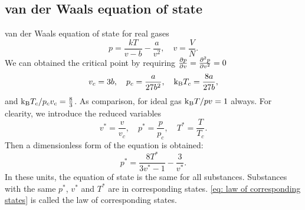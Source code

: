 \documentclass[10pt]{article}
\begin{document}
\subsection{van der Waals equation of state}

van der Waals equation of state for real gases
\begin{equation}
	p = \frac{k T}{v - b} - \frac{a}{v^2}, \quad v = \frac{V}{N}.
\end{equation}
We can obtained the critical point by requiring $\pdv{p}{v} = \pdv[2]{p}{v} = 0$
\begin{equation}
	v_c = 3b, \quad p_c = \frac{a}{27b^2}, \quad {\mathrm{k_B}} T_c = \frac{8a}{27b},
\end{equation}
and ${\mathrm{k_B}} T_c / p_c v_c = \frac{8}{3}$. As comparison, for ideal gas ${\mathrm{k_B}} T / p v = 1$ always. For clearity, we  introduce the reduced variables
\begin{equation}
	v^* = \frac{v}{v_c}, \quad p^* = \frac{p}{p_c}, \quad T^* = \frac{T}{T_c}.
\end{equation}
Then a dimensionless form of the equation is obtained:
\begin{equation}
	p^* = \frac{8T^*}{3v^* - 1} - \frac{3}{v^*}. \label{eq: law of corresponding states}
\end{equation}
In these units, the equation of state is the same for all substances. Substances with the same $p^*$, $v^*$ and $T^*$ are in corresponding states. \eqref{eq: law of corresponding states} is called the law of corresponding states.
\end{document}
